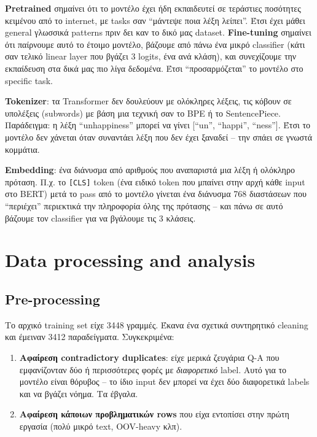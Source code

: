 \documentclass[12pt]{fphw}
\begin{document}
\textbf{Pretrained} σημαίνει ότι το μοντέλο έχει ήδη εκπαιδευτεί σε τεράστιες ποσότητες κειμένου από το internet, με tasks σαν ``μάντεψε ποια λέξη λείπει''. Έτσι έχει μάθει general γλωσσικά patterns πριν δει καν το δικό μας dataset. \textbf{Fine-tuning} σημαίνει ότι παίρνουμε αυτό το έτοιμο μοντέλο, βάζουμε από πάνω ένα μικρό classifier (κάτι σαν τελικό linear layer που βγάζει 3 logits, ένα ανά κλάση), και συνεχίζουμε την εκπαίδευση στα δικά μας πιο λίγα δεδομένα. Έτσι ``προσαρμόζεται'' το μοντέλο στο specific task.

\textbf{Tokenizer}: τα Transformer δεν δουλεύουν με ολόκληρες λέξεις, τις κόβουν σε υπολέξεις (subwords) με βάση μια τεχνική σαν το BPE ή το SentencePiece. Παράδειγμα: η λέξη ``unhappiness'' μπορεί να γίνει [``un'', ``happi'', ``ness'']. Έτσι το μοντέλο δεν χάνεται όταν συναντάει λέξη που δεν έχει ξαναδεί -- την σπάει σε γνωστά κομμάτια.

\textbf{Embedding}: ένα διάνυσμα από αριθμούς που αναπαριστά μια λέξη ή ολόκληρο πρόταση. Π.χ. το \texttt{[CLS]} token (ένα ειδικό token που μπαίνει στην αρχή κάθε input στο BERT) μετά το pass από το μοντέλο γίνεται ένα διάνυσμα 768 διαστάσεων που ``περιέχει'' περιεκτικά την πληροφορία όλης της πρότασης -- και πάνω σε αυτό βάζουμε τον classifier για να βγάλουμε τις 3 κλάσεις.

\section{Data processing and analysis}

\subsection{Pre-processing}

Το αρχικό training set είχε 3448 γραμμές. Έκανα ένα σχετικά συντηρητικό cleaning και έμειναν 3412 παραδείγματα. Συγκεκριμένα:

\begin{enumerate}
    \item \textbf{Αφαίρεση contradictory duplicates}: είχε μερικά ζευγάρια Q-A που εμφανίζονταν δύο ή περισσότερες φορές με \emph{διαφορετικό} label. Αυτό για το μοντέλο είναι θόρυβος -- το ίδιο input δεν μπορεί να έχει δύο διαφορετικά labels και να βγάζει νόημα. Τα έβγαλα.
    \item \textbf{Αφαίρεση κάποιων προβληματικών rows} που είχα εντοπίσει στην πρώτη εργασία (πολύ μικρό text, OOV-heavy κλπ).
\end{enumerate}
\end{document}
